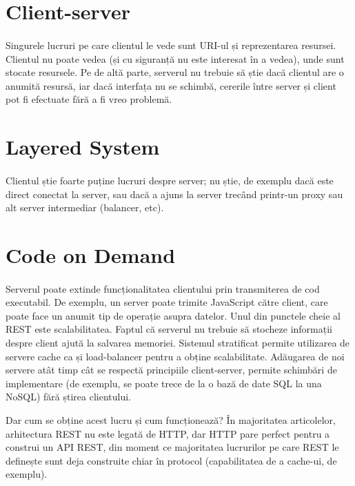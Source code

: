\section{Client-server}

\paragraph{}
Singurele lucruri pe care clientul le vede sunt URI-ul și reprezentarea resursei. Clientul nu poate vedea (și cu siguranță nu este interesat în a vedea), unde sunt stocate resursele. Pe de altă parte, serverul nu trebuie să știe dacă clientul are o anumită resursă, iar dacă interfața nu se schimbă, cererile între server și client pot fi efectuate fără a fi vreo problemă. \cite{19}

\section{Layered System}

\paragraph{} Clientul știe foarte puține lucruri despre server; nu știe, de exemplu dacă este direct conectat la server, sau dacă a ajuns la server trecând printr-un proxy sau alt server intermediar (balancer, etc).\cite{19}

\section{Code on Demand}

\paragraph{}
Serverul poate extinde funcționalitatea clientului prin transmiterea de cod executabil. De exemplu, un server poate trimite JavaScript către client, care poate face un anumit tip de operație asupra datelor.
Unul din punctele cheie al REST este scalabilitatea. Faptul că serverul nu trebuie să stocheze informații despre client ajută la salvarea memoriei. Sistemul stratificat permite utilizarea de servere cache ca și load-balancer pentru a obține scalabilitate. Adăugarea de noi servere atât timp cât se respectă principiile client-server, permite schimbări de implementare (de exemplu, se poate trece de la o bază de date SQL la una NoSQL) fără știrea clientului.

Dar cum se obține acest lucru și cum funcționează? În majoritatea articolelor, arhitectura REST nu este legată de HTTP, dar HTTP pare perfect pentru a construi un API REST, din moment ce majoritatea lucrurilor pe care REST le definește sunt deja construite chiar în protocol (capabilitatea de a cache-ui, de exemplu).

